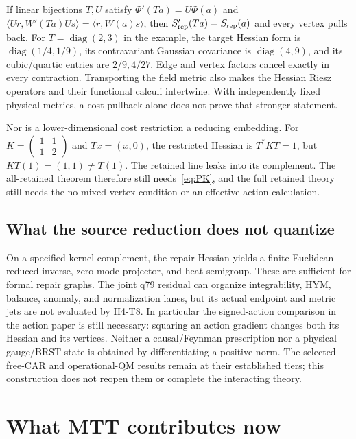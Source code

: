 \documentclass[11pt,a4paper]{article}
\begin{document}
If linear bijections $T,U$ satisfy
$\Phi'(Ta)=U\Phi(a)$ and
$\langle Ur,W'(Ta)Us\rangle=\langle r,W(a)s\rangle$,
then $S'_{\rm rep}(Ta)=S_{\rm rep}(a)$ and every vertex pulls back.
For $T=\operatorname{diag}(2,3)$ in the example, the target Hessian
form is $\operatorname{diag}(1/4,1/9)$, its contravariant Gaussian
covariance is $\operatorname{diag}(4,9)$, and its cubic/quartic entries
are $2/9,4/27$. Edge and vertex factors cancel exactly in every contraction.
Transporting the field metric also makes the Hessian Riesz operators and
their functional calculi intertwine. With independently fixed physical
metrics, a cost pullback alone does not prove that stronger statement.

Nor is a lower-dimensional cost restriction a reducing embedding. For
$K=\left(\begin{smallmatrix}1&1\\1&2\end{smallmatrix}\right)$ and
$Tx=(x,0)$, the restricted Hessian is $T^*KT=1$, but
$KT(1)=(1,1)\ne T(1)$. The retained line leaks into its complement.
The all-retained theorem therefore still needs~\eqref{eq:PK}, and the
full retained theory still needs the no-mixed-vertex condition or an
effective-action calculation.

\subsection{What the source reduction does not quantize}

On a specified kernel complement, the repair Hessian yields a finite
Euclidean reduced inverse, zero-mode projector, and heat semigroup.
These are sufficient for formal repair graphs. The joint q79 residual can
organize integrability, HYM, balance, anomaly, and normalization lanes,
but its actual endpoint and metric jets are not evaluated by H4-T8.
In particular the signed-action comparison in the action paper
\cite{ClosureAction5} is still necessary: squaring an action gradient
changes both its Hessian and its vertices. Neither a causal/Feynman
prescription nor a physical gauge/BRST state is obtained by differentiating
a positive norm. The selected free-CAR and operational-QM results remain
at their established tiers; this construction does not reopen them or
complete the interacting theory.

\section{What MTT contributes now}
\end{document}
